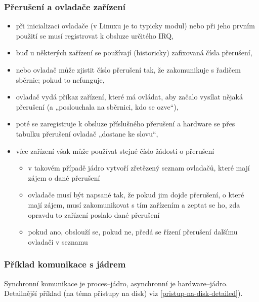 \documentclass[a4paper, 11pt]{article}
\begin{document}
\subsubsection{Přerušení a ovladače zařízení}
\begin{itemize}
    \item při inicializaci ovladače (v Linuxu je to typicky modul) nebo při jeho prvním použití se musí registrovat k obsluze určitého IRQ,
    \item buď u některých zařízení se používají (historicky) zafixovaná čísla přerušení,
    \item nebo ovladač může zjistit číslo přerušení tak, že zakomunikuje s řadičem sběrnic; pokud to nefunguje,
    \item ovladač vydá příkaz zařízení, které má ovládat, aby začalo vysílat nějaká přerušení (a „poslouchala na sběrnici, kdo se ozve“),
    \item poté se zaregistruje k obsluze příslušného přerušení a hardware se přes tabulku přerušení ovladač „dostane ke slovu“,
    \item více zařízení však může používat stejné číslo žádosti o přerušení
    \begin{itemize}
        \item v takovém případě jádro vytvoří zřetězený seznam ovladačů, které mají zájem o dané přerušení
        \item ovladače musí být napsané tak, že pokud jim dojde přerušení, o které mají zájem, musí zakomunikovat s tím zařízením a zeptat se ho, zda opravdu to zařízení poslalo dané přerušení
        \item pokud ano, obslouží se, pokud ne, předá se řízení přerušení dalšímu ovladači v seznamu
    \end{itemize}
\end{itemize}


\subsubsection{Příklad komunikace s jádrem} \label{pristup-na-disk}
Synchronní komunikace je proces--jádro, asynchronní je hardware--jádro. Detailnější příklad (na téma přístupy na disk) viz \ref{pristup-na-disk-detailed}).
\end{document}
